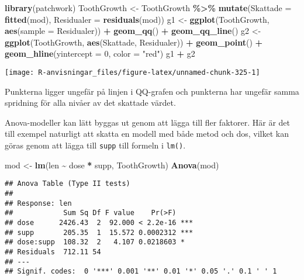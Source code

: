 \documentclass[
]{book}
\newenvironment{Shaded}{\begin{snugshade}}{\end{snugshade}}
\newcommand{\AttributeTok}[1]{\textcolor[rgb]{0.13,0.29,0.53}{#1}}
\newcommand{\DecValTok}[1]{\textcolor[rgb]{0.00,0.00,0.81}{#1}}
\newcommand{\FunctionTok}[1]{\textcolor[rgb]{0.13,0.29,0.53}{\textbf{#1}}}
\newcommand{\NormalTok}[1]{#1}
\newcommand{\OtherTok}[1]{\textcolor[rgb]{0.56,0.35,0.01}{#1}}
\newcommand{\SpecialCharTok}[1]{\textcolor[rgb]{0.81,0.36,0.00}{\textbf{#1}}}
\newcommand{\StringTok}[1]{\textcolor[rgb]{0.31,0.60,0.02}{#1}}
\theoremstyle{definition}
\theoremstyle{definition}
\theoremstyle{definition}
\theoremstyle{definition}
\theoremstyle{remark}
\begin{document}
\begin{Shaded}
\begin{Highlighting}[]
\FunctionTok{library}\NormalTok{(patchwork)}
\NormalTok{ToothGrowth }\OtherTok{\textless{}{-}}\NormalTok{ ToothGrowth }\SpecialCharTok{\%\textgreater{}\%} 
  \FunctionTok{mutate}\NormalTok{(}\AttributeTok{Skattade =} \FunctionTok{fitted}\NormalTok{(mod),}
         \AttributeTok{Residualer =} \FunctionTok{residuals}\NormalTok{(mod))}
\NormalTok{g1 }\OtherTok{\textless{}{-}} \FunctionTok{ggplot}\NormalTok{(ToothGrowth, }\FunctionTok{aes}\NormalTok{(}\AttributeTok{sample =}\NormalTok{ Residualer)) }\SpecialCharTok{+} \FunctionTok{geom\_qq}\NormalTok{() }\SpecialCharTok{+} \FunctionTok{geom\_qq\_line}\NormalTok{()}
\NormalTok{g2 }\OtherTok{\textless{}{-}} \FunctionTok{ggplot}\NormalTok{(ToothGrowth, }\FunctionTok{aes}\NormalTok{(Skattade, Residualer)) }\SpecialCharTok{+}
  \FunctionTok{geom\_point}\NormalTok{() }\SpecialCharTok{+}
  \FunctionTok{geom\_hline}\NormalTok{(}\AttributeTok{yintercept =} \DecValTok{0}\NormalTok{, }\AttributeTok{color =} \StringTok{"red"}\NormalTok{)}
\NormalTok{g1 }\SpecialCharTok{+}\NormalTok{ g2}
\end{Highlighting}
\end{Shaded}

\begin{center}\texttt{[image: R-anvisningar\_files/figure-latex/unnamed-chunk-325-1]} \end{center}

Punkterna ligger ungefär på linjen i QQ-grafen och punkterna har ungefär samma spridning för alla nivåer av det skattade värdet.

Anova-modeller kan lätt byggas ut genom att lägga till fler faktorer. Här är det till exempel naturligt att skatta en modell med både metod och dos, vilket kan göras genom att lägga till \texttt{supp} till formeln i \texttt{lm()}.

\begin{Shaded}
\begin{Highlighting}[]
\NormalTok{mod }\OtherTok{\textless{}{-}} \FunctionTok{lm}\NormalTok{(len }\SpecialCharTok{\textasciitilde{}}\NormalTok{ dose }\SpecialCharTok{*}\NormalTok{ supp, ToothGrowth)}
\FunctionTok{Anova}\NormalTok{(mod)}
\end{Highlighting}
\end{Shaded}

\begin{verbatim}
## Anova Table (Type II tests)
## 
## Response: len
##            Sum Sq Df F value    Pr(>F)    
## dose      2426.43  2  92.000 < 2.2e-16 ***
## supp       205.35  1  15.572 0.0002312 ***
## dose:supp  108.32  2   4.107 0.0218603 *  
## Residuals  712.11 54                      
## ---
## Signif. codes:  0 '***' 0.001 '**' 0.01 '*' 0.05 '.' 0.1 ' ' 1
\end{verbatim}
\end{document}
